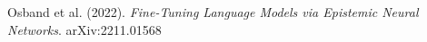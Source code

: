 \documentclass[preview]{standalone}
\begin{document}
Osband et al. (2022). \textit{Fine-Tuning Language Models via Epistemic Neural Networks}. arXiv:2211.01568\\
\end{document}

